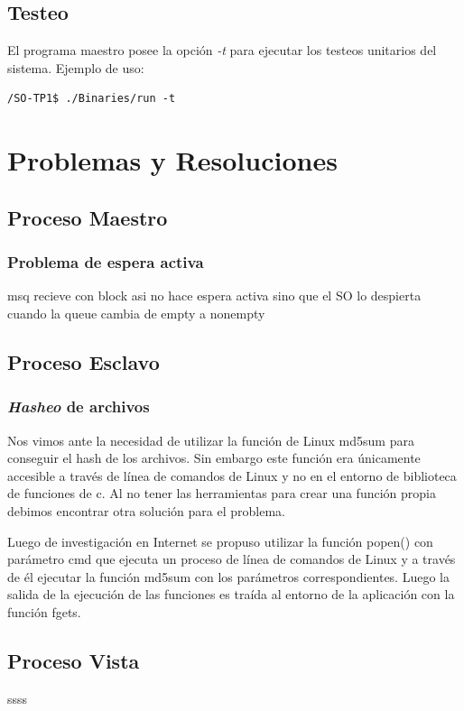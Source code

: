 \documentclass[10pt,a4paper]{report}
\begin{document}
\section{Testeo}
El programa maestro posee la opción \textit{-t} para ejecutar los testeos unitarios del sistema. Ejemplo de uso:
\begin{lstlisting}
/SO-TP1$ ./Binaries/run -t
\end{lstlisting}

\chapter{Problemas y Resoluciones}
\section{Proceso Maestro}
\subsection{Problema de espera activa}
msq recieve con block asi no hace espera activa sino que el SO lo despierta cuando la queue cambia de empty a nonempty
\section{Proceso Esclavo}
\subsection{\textit{Hasheo} de archivos}
Nos vimos ante la necesidad de utilizar la función de Linux md5sum para conseguir el hash de los archivos. Sin embargo este función
era únicamente accesible a través de línea de comandos de Linux y no en el entorno de biblioteca de funciones de c. Al no tener las
herramientas para crear una función propia debimos encontrar otra solución para el problema.

Luego de investigación en Internet se propuso utilizar la función popen() con parámetro cmd que ejecuta un proceso de línea de comandos
de Linux y a través de él ejecutar la función md5sum con los parámetros correspondientes. Luego la salida de la ejecución de las funciones
es traída al entorno de la aplicación con la función fgets.
\section{Proceso Vista}
ssss
\end{document}
